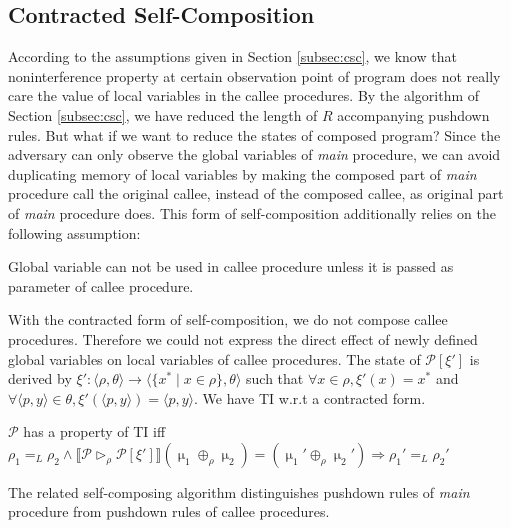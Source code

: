 \documentclass{llncs}
\begin{document}
\subsection{\label{subsec:csc2}Contracted Self-Composition}

According to the assumptions given in Section \ref{subsec:csc}, we
know that noninterference property at certain observation point of
program does not really care the value of local variables in the
callee procedures. By the algorithm of Section \ref{subsec:csc}, we
have reduced the length of $R$ accompanying pushdown rules. But what
if we want to reduce the states of composed program? Since the
adversary can only observe the global variables of \emph{main}
procedure, we can avoid duplicating memory of local variables by
making the composed part of \emph{main} procedure call the original
callee, instead of the composed callee, as original part of
\emph{main} procedure does. This form of self-composition
additionally relies on the following assumption:
\begin{compactitem}
\item Global variable can not be used in callee procedure unless
it is passed as parameter of callee procedure.
\end{compactitem}
With the contracted form of self-composition, we do not compose
callee procedures. Therefore we could not express the direct effect
of newly defined global variables on local variables of callee
procedures. The state of $\mathcal{P}[\xi']$ is derived by
$\xi':\langle\rho,\theta\rangle\rightarrow\langle\{x^* \mid x\in
\rho\},\theta\rangle$ such that $\forall x\in \rho, \xi'(x)=x^*$ and
$\forall \langle p,y\rangle \in \theta, \xi'(\langle p,y\rangle
)=\langle p,y\rangle $. We have TI w.r.t a contracted form.
\begin{definition}
$\mathcal {P}$ has a property of
TI iff\\
\hspace*{\fill}$\rho_1 =_L \rho_2 \wedge \llbracket
\mathcal{P}\vartriangleright_\rho
\mathcal{P}[\xi']\rrbracket(\upmu_1 \oplus_\rho \upmu_2)=(\upmu_1'
\oplus_\rho \upmu_2')\Rightarrow \rho_1' =_L \rho_2'$\hspace*{\fill}
\end{definition}
\indent The related self-composing algorithm distinguishes pushdown
rules of \emph{main} procedure from pushdown rules of callee
procedures.
\end{document}
